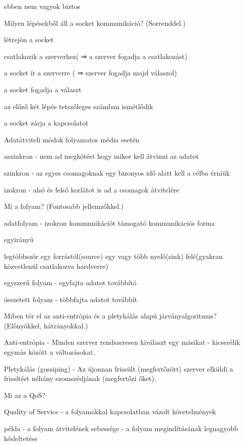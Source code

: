 \documentclass[twoside, a4paper, 12pt]{article}
\begin{document}
\begin{description}
        ebben nem vagyok biztos
    \item  Milyen lépésekből áll a socket kommunikáció? (Sorrenddel.)
    \item létrejön a socket
    \item csatlakozik a szerverhez( ⇒ a szerver fogadja a csatlakozást)
    \item a socket ír a szerverre ( ⇒ szerver fogadja majd válaszol)
    \item a socket fogadja a választ
    \item az előző két lépés tetszőleges számban ismétlődik
    \item a socket zárja a kapcsolatot
    \item  Adatátviteli módok folyamatos média esetén
    \item aszinkron
        - nem ad megkötést hogy mikor kell átvinni az adatot
    \item szinkron
        - az egyes csomagoknak egy bizonyos idő alatt kell a célba érniük
    \item izokron 
        - alsó és felső korlátot is ad a csomagok átvitelére
    \item  Mi a folyam? (Fontosabb jellemzőkkel.)
    \item adatfolyam
        - izokron kommunikációt támogató kommunikációs forma
    \item egyirányú
    \item legtöbbször egy forrástól(source) egy vagy több nyelő(sink) felé(gyakran közvetlenül csatlakozva hardverre)
    \item egyszerű folyam
        - egyfajta adatot továbbító
    \item összetett folyam
        - többfajta adatot továbbít
    \item  Miben tér el az anti-entrópia és a pletykálás alapú járványalgoritmus? (Előnyökkel, hátrányokkal.)
    \item Anti-entrópia
        - Minden szerver rendszeresen kiválaszt egy másikat
        - kicserélik egymás között a változásokat.
    \item Pletykálás (gossiping)
        - Az újonnan frissült (megfertőzött) szerver elküldi a frissítést néhány szomszédjának (megfertőzi őket).
    \item  Mi az a QoS?
    \item Quality of Service 
        - a folyamokkal kapcsolatban vázolt követelmények
    \item példa
        - a folyam átvitelének sebessége
        - a folyam megindításának legnagyobb késleltetése

\end{description}
\end{document}
